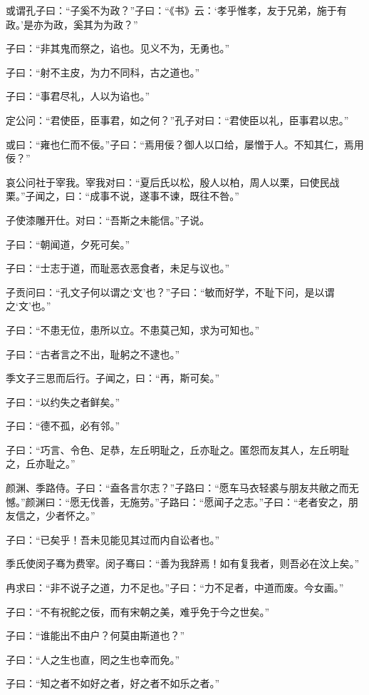 \documentclass[a5paper]{ctexbook}
\begin{document}
    或谓孔子曰：“子奚不为政？”子曰：“《书》云：‘孝乎惟孝，友于兄弟，施于有政。’是亦为政，奚其为为政？”

    子曰：“非其鬼而祭之，谄也。见义不为，无勇也。”

    子曰：“射不主皮，为力不同科，古之道也。”

    子曰：“事君尽礼，人以为谄也。”

    定公问：“君使臣，臣事君，如之何？”孔子对曰：“君使臣以礼，臣事君以忠。”

    或曰：“雍也仁而不佞。”子曰：“焉用佞？御人以口给，屡憎于人。不知其仁，焉用佞？”

    哀公问社于宰我。宰我对曰：“夏后氏以松，殷人以柏，周人以栗，曰使民战栗。”子闻之，曰：“成事不说，遂事不谏，既往不咎。”

    子使漆雕开仕。对曰：“吾斯之未能信。”子说。
    
    子曰：“朝闻道，夕死可矣。”
    
    子曰：“士志于道，而耻恶衣恶食者，未足与议也。”

    子贡问曰：“孔文子何以谓之‘文’也？”子曰：“敏而好学，不耻下问，是以谓之‘文’也。”

    子曰：“不患无位，患所以立。不患莫己知，求为可知也。”

    

    子曰：“古者言之不出，耻躬之不逮也。”

    季文子三思而后行。子闻之，曰：“再，斯可矣。”
    
    子曰：“以约失之者鲜矣。”

    子曰：“德不孤，必有邻。”

    子曰：“巧言、令色、足恭，左丘明耻之，丘亦耻之。匿怨而友其人，左丘明耻之，丘亦耻之。”

    颜渊、季路侍。子曰：“盍各言尔志？”子路曰：“愿车马衣轻裘与朋友共敝之而无憾。”颜渊曰：“愿无伐善，无施劳。”子路曰：“愿闻子之志。”子曰：“老者安之，朋友信之，少者怀之。”

    子曰：“已矣乎！吾未见能见其过而内自讼者也。”

    季氏使闵子骞为费宰。闵子骞曰：“善为我辞焉！如有复我者，则吾必在汶上矣。”

    冉求曰：“非不说子之道，力不足也。”子曰：“力不足者，中道而废。今女画。”

    子曰：“不有祝𬶍之佞，而有宋朝之美，难乎免于今之世矣。”

    子曰：“谁能出不由户？何莫由斯道也？”

    子曰：“人之生也直，罔之生也幸而免。”

    子曰：“知之者不如好之者，好之者不如乐之者。”
\end{document}
